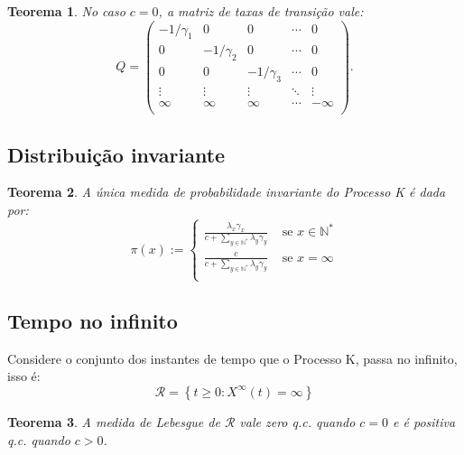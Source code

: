 \documentclass[xcolor=pdftex,dvipsnames]{beamer}
\newcommand{\RR}{{\mathcal{R}}}
\newcommand{\Nz}{{\mathbb{N^*}}}
\newcommand{\qc}{{\emph{q.c.}} }
\newtheorem{teorema}{Teorema}
\begin{document}
\begin{frame}
  \begin{teorema}
    No caso $c = 0$, a matriz de taxas de transição vale:
    \begin{displaymath}
      Q = \left(
        \begin{array}{ccccc}
          -1/\gamma_1 & 0 & 0 & \cdots & 0\\
          0 & -1/\gamma_2 & 0 & \cdots & 0\\
          0 & 0 & -1/\gamma_3 & \cdots & 0\\
          \vdots & \vdots & \vdots & \ddots & \vdots \\
          \infty & \infty & \infty & \cdots & -\infty\\
        \end{array}
      \right).
    \end{displaymath}
  \end{teorema}
\end{frame}

\subsection{Distribuição invariante}

\begin{frame}
  \begin{teorema}
    A única medida de probabilidade invariante do Processo K é dada
    por:
    \begin{displaymath}
      \pi(x) := \begin{cases}
        \frac{\lambda_x \gamma_x}{c + \sum_{y \in \Nz} \lambda_y \gamma_y}
        & \textrm{ se } x \in \Nz \\
        \frac{c}{c + \sum_{y \in \Nz} \lambda_y \gamma_y}
        & \textrm{ se } x = \infty \\
      \end{cases}
    \end{displaymath}
  \end{teorema}
\end{frame}

\subsection{Tempo no infinito}

\begin{frame}

  Considere o conjunto dos instantes de tempo que o Processo K, passa
  no infinito, isso é:
  \begin{displaymath}
    \RR = \left\{ t \geq 0: X^\infty(t) = \infty \right\}
  \end{displaymath}
  \pause
  \begin{teorema}
    A medida de Lebesgue de $\RR$ vale zero \qc quando $c = 0$ e é
    positiva \qc quando $c > 0$.
  \end{teorema}
\end{frame}
\end{document}
